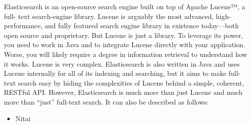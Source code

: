 
Elasticsearch is an open-source search engine built on top of Apache Lucene™, a full- text search-engine library. Lucene is arguably the most advanced, high-performance, and fully featured search engine library in existence today—both open source and proprietary.  But Lucene is just a library. To leverage its power, you need to work in Java and to integrate Lucene directly with your application. Worse, you will likely require a degree in information retrieval to understand how it works. Lucene is very complex.  Elasticsearch is also written in Java and uses Lucene internally for all of its indexing and searching, but it aims to make full-text search easy by hiding the complexities of Lucene behind a simple, coherent, RESTful API.  However, Elasticsearch is much more than just Lucene and much more than “just” full-text search. It can also be described as follows:
\begin{itemize}
	\item Nitai
\end{itemize}
